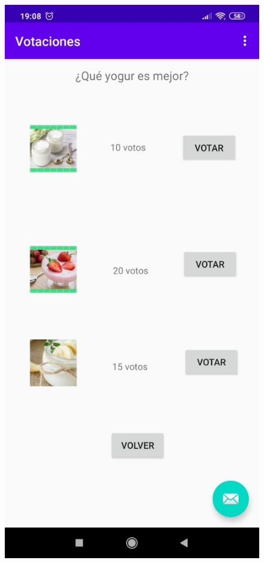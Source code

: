 \documentclass{article}
\begin{document}
\begin{figure}[H]
	\centering
	\includegraphics[totalheight=8cm]{img/android8}
\end{figure}
\end{document}
